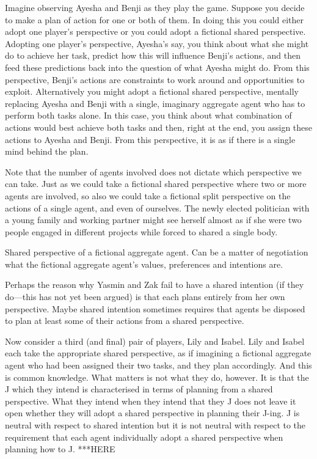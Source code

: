 \documentclass[12pt,\papersize]{extarticle}
\begin{document}
Imagine observing Ayesha and Benji as they play the game. 
Suppose you decide to make a plan of action for one or both of them.
In doing this you could either adopt one player's perspective or you could adopt a fictional shared perspective.
Adopting one player's perspective, Ayesha's say, 
	you think about what she might do to achieve her task,
	predict how this will influence Benji's actions,
	and then feed  these predictions back into the question of what Ayesha might do.
From this perspective, Benji's actions are constraints to work around and opportunities to exploit.
Alternatively you might adopt a fictional shared perspective, 
	 mentally replacing Ayesha and Benji with a single, imaginary aggregate agent who has to perform both tasks alone.
	 In this case, you think about what combination of actions would best achieve both tasks and then, right at the end, you assign these actions to Ayesha and Benji.
From this perspective, it is as if there is a single mind behind the plan.

Note that the number of agents involved does not dictate which perspective we can take.
Just as we could take a fictional shared perspective where two or more agents are involved, 
so also we could take a fictional split perspective on the actions of  a single agent, and even of ourselves.
The newly elected  politician with a young family and working partner might see herself almost as if she were two people engaged in different projects while forced to shared a single body. 

Shared perspective of a fictional aggregate agent.
Can be a matter of negotiation what the fictional aggregate agent's values, preferences and intentions are.

Perhaps the reason why Yasmin and Zak fail to have a shared intention (if they do---this has not yet been argued) is that each plans entirely from her own perspective. 
Maybe shared intention sometimes requires that agents be disposed to plan at least some of their actions from a shared perspective.

Now consider a third (and final) pair of players, Lily and Isabel.
Lily and Isabel each take the appropriate shared perspective, as if imagining a fictional aggregate agent who had been assigned their two tasks, 
and they plan accordingly.
And this is common knowledge.
What matters is not what they do, however.
It is that the J which they intend is characterised in terms of planning from a shared perspective.
What they intend when they intend that they J does not leave it open whether they will adopt a shared perspective in planning their J-ing.
J is neutral with respect to shared intention but it is not neutral with respect to the requirement that each agent individually adopt a shared perspective when planning how to J.
***HERE
\end{document}
